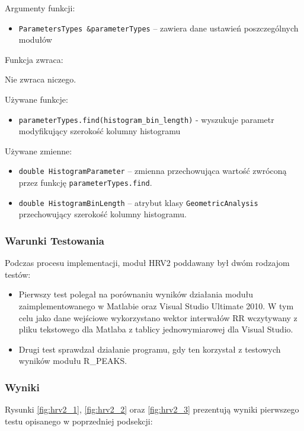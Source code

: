 \documentclass[a4paper, 11pt]{article}
\begin{document}
\medskip{}


Argumenty funkcji:
\begin{itemize}
\item \verb+ParametersTypes &parameterTypes+ -- zawiera dane ustawień poszczególnych
modułów
\end{itemize}
\medskip{}


Funkcja zwraca:

Nie zwraca niczego. 

\medskip{}


Używane funkcje:
\begin{itemize}
\item \verb+parameterTypes.find(histogram_bin_length)+
- wyszukuje parametr modyfikujący szerokość kolumny histogramu\medskip{}

\end{itemize}
Używane zmienne:
\begin{itemize}
\item \verb+double HistogramParameter+ -- zmienna przechowująca wartość zwróconą
przez funkcję \verb+parameterTypes.find+.
\item \verb+double HistogramBinLength+ -- atrybut klasy \verb+GeometricAnalysis+ przechowujący
szerokość kolumny histogramu.
\end{itemize}


\subsubsection{Warunki Testowania}
\label{sec:hrv2:tests}

Podczas procesu implementacji, moduł HRV2 poddawany był dwóm rodzajom
testów:
\begin{itemize}
\item Pierwszy test polegał na porównaniu wyników działania modułu zaimplementowanego
w Matlabie oraz Visual Studio Ultimate 2010. W tym celu jako dane
wejściowe wykorzystano wektor interwałów RR wczytywany z pliku tekstowego
dla Matlaba z tablicy jednowymiarowej dla Visual Studio.
\item Drugi test sprawdzał działanie programu, gdy ten korzystał z testowych
wyników modułu R\_PEAKS.
\end{itemize}

\subsubsection{Wyniki}
\label{sec:hrv2:results}

Rysunki \ref{fig:hrv2_1}, \ref{fig:hrv2_2} oraz \ref{fig:hrv2_3} prezentują wyniki pierwszego testu opisanego w poprzedniej
podsekcji:
\end{document}
